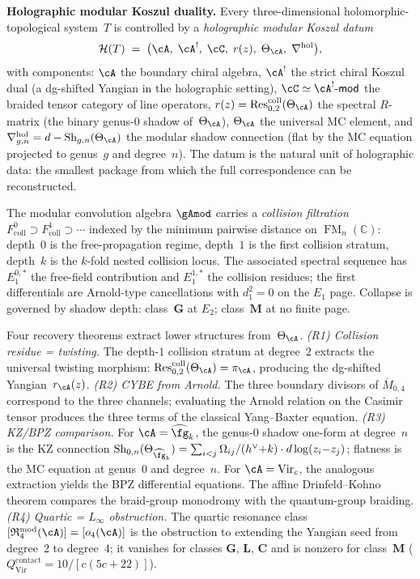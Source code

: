 \bigskip

\noindent\textbf{Holographic modular Koszul duality.}
Every three-dimensional holomorphic-topological system~$T$ is
controlled by a \emph{holographic modular Koszul datum}
\[
\mathcal H(T)
\;=\;
\bigl(\cA,\;\cA^!,\;\cC,\;r(z),\;\Theta_\cA,\;\nabla^{\mathrm{hol}}\bigr),
\]
with components: $\cA$ the boundary chiral algebra, $\cA^!$ the strict
chiral Koszul dual (a dg-shifted Yangian in the holographic setting),
$\cC\simeq\cA^!\text{-}\mathsf{mod}$ the braided tensor category of line
operators, $r(z)=\operatorname{Res}^{\mathrm{coll}}_{0,2}(\Theta_\cA)$
the spectral $R$-matrix (the binary genus-$0$ shadow of~$\Theta_\cA$),
$\Theta_\cA$ the universal MC element, and
$\nabla^{\mathrm{hol}}_{g,n}=d-\operatorname{Sh}_{g,n}(\Theta_\cA)$ the
modular shadow connection (flat by the MC equation projected to genus~$g$
and degree~$n$). The datum is the natural unit of holographic data: the
smallest package from which the full correspondence can be reconstructed.

The modular convolution algebra $\gAmod$
carries a \emph{collision filtration}
$F^0_{\mathrm{coll}}\supset F^1_{\mathrm{coll}}\supset\cdots$
indexed by the minimum pairwise distance on
$\operatorname{FM}_n(\mathbb C)$: depth~$0$ is the
free-propagation regime, depth~$1$ is the first collision stratum,
depth~$k$ is the $k$-fold nested collision locus. The associated
spectral sequence has $E_1^{0,*}$ the free-field contribution and
$E_1^{1,*}$ the collision residues; the first differentials are
Arnold-type cancellations with $d_1^2=0$ on the $E_1$ page. Collapse
is governed by shadow depth: class~$\mathbf{G}$ at $E_2$;
class~$\mathbf{M}$ at no finite page.

Four recovery theorems extract lower structures from~$\Theta_\cA$.
\emph{(R1) Collision residue = twisting.} The depth-$1$ collision
stratum at degree~$2$ extracts the universal twisting morphism:
$\operatorname{Res}^{\mathrm{coll}}_{0,2}(\Theta_\cA)=\pi_\cA$,
producing the dg-shifted Yangian~$r_\cA(z)$.
\emph{(R2) CYBE from Arnold.} The three boundary divisors of
$\overline M_{0,4}$ correspond to the three channels; evaluating the
Arnold relation on the Casimir tensor produces the three terms of the
classical Yang--Baxter equation.
\emph{(R3) KZ/BPZ comparison.} For $\cA=\widehat{\fg}_k$, the
genus-$0$ shadow one-form at degree~$n$ is the KZ connection
$\operatorname{Sh}_{0,n}(\Theta_{\widehat{\fg}_k})
=\sum_{i<j}\Omega_{ij}/(h^\vee{+}k)\cdot d\log(z_i{-}z_j)$;
flatness is the MC equation at genus~$0$ and degree~$n$. For
$\cA=\mathrm{Vir}_c$, the analogous extraction yields the BPZ
differential equations. The affine Drinfeld--Kohno theorem compares
the braid-group monodromy with the quantum-group braiding.
\emph{(R4) Quartic = $L_\infty$ obstruction.} The quartic resonance
class $[\mathfrak R^{\mathrm{mod}}_4(\cA)]=[o_4(\cA)]$ is the
obstruction to extending the Yangian seed from degree~$2$ to degree~$4$;
it vanishes for classes $\mathbf{G}$, $\mathbf{L}$, $\mathbf{C}$ and is
nonzero for class~$\mathbf{M}$
($Q^{\mathrm{contact}}_{\mathrm{Vir}}=10/[c(5c+22)]$).


